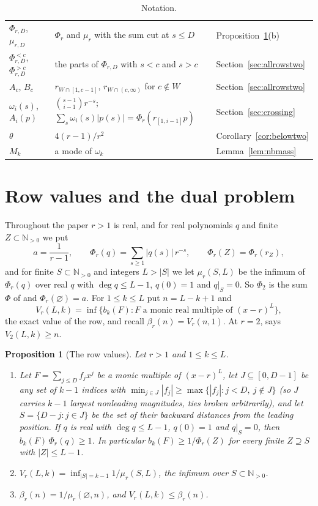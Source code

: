 \documentclass[11pt]{article}
\newtheorem{proposition}[theorem]{Proposition}
\newcommand{\N}{\mathbb N}
\begin{document}
\begin{table}[tp]
\begin{tabular}{@{}l p{} l@{}}
$\Phi_{r,D}$, $\mu_{r,D}$ & $\Phi_r$ and $\mu_r$ with the sum cut at $s\le D$
  & Proposition~\ref{prop:rowvalue}(b)\\
$\Phi_{r,D}^{<c}$, $\Phi_{r,D}^{>c}$ & the parts of $\Phi_{r,D}$ with
  $s<c$ and $s>c$ & Section~\ref{sec:allrowstwo}\\
$A_c$, $B_c$ & $r_{W\cap[1,c-1]}$, $r_{W\cap(c,\infty)}$ for $c\notin W$
  & Section~\ref{sec:allrowstwo}\\
$\omega_i(s)$, $A_i(p)$ & $\binom{s-1}{i-1}r^{-s}$;
  $\sum_s\omega_i(s)|p(s)|=\Phi_r(r_{[1,i-1]}p)$ & Section~\ref{sec:crossing}\\
$\theta$ & $4(r-1)/r^2$ & Corollary~\ref{cor:belowtwo}\\
$M_k$ & a mode of $\omega_k$ & Lemma~\ref{lem:nbmass}\\
\hline
\end{tabular}
\caption{Notation.}\label{tab:notation}
\end{table}

\section{Row values and the dual problem}\label{sec:rowvalues}

Throughout the paper $r>1$ is real, and for real polynomials $q$ and
finite $Z\subset\N_{>0}$ we put
\[
  a=\frac1{r-1},\qquad
  \Phi_r(q)=\sum_{s\ge1}|q(s)|\,r^{-s},\qquad
  \Phi_r(Z)=\Phi_r(r_Z),
\]
and for finite $S\subset\N_{>0}$ and integers $L>|S|$ we let
$\mu_r(S,L)$ be the infimum of $\Phi_r(q)$ over real $q$ with $\deg q\le L-1$,
$q(0)=1$ and $q|_S=0$.  So $\Phi_2$ is the sum $\Phi$ of
\cite[Section~5]{coefficient-mass} and $\Phi_r(\varnothing)=a$.  For
$1\le k\le L$ put $n=L-k+1$ and
\[
  V_r(L,k)=\inf\{b_k(F): F\text{ a monic real multiple of }(x-r)^L\},
\]
the exact value of the row, and recall $\beta_r(n)=V_r(n,1)$.  At
$r=2$, \cite[Theorem~5.9]{coefficient-mass} says $V_2(L,k)\ge n$.

\begin{proposition}[The row values]\label{prop:rowvalue}
Let $r>1$ and $1\le k\le L$.
\begin{enumerate}
\item[(a)] Let $F=\sum_{j\le D}f_jx^j$ be a monic multiple of $(x-r)^L$,
let $J\subseteq[0,D-1]$ be any set of $k-1$ indices with
$\min_{j\in J}|f_j|\ge\max\{|f_j|:j<D,\ j\notin J\}$ (so $J$ carries $k-1$
largest nonleading magnitudes, ties broken arbitrarily), and let
$S=\{D-j:j\in J\}$ be the set of their backward distances from the leading
position.  If $q$ is real with $\deg q\le L-1$, $q(0)=1$ and $q|_S=0$, then
$b_k(F)\,\Phi_r(q)\ge1$.  In particular $b_k(F)\ge1/\Phi_r(Z)$ for every
finite $Z\supseteq S$ with $|Z|\le L-1$.
\item[(b)] $V_r(L,k)=\inf_{|S|=k-1}1/\mu_r(S,L)$, the infimum over
$S\subset\N_{>0}$.
\item[(c)] $\beta_r(n)=1/\mu_r(\varnothing,n)$, and $V_r(L,k)\le\beta_r(n)$.
\end{enumerate}
\end{proposition}
\end{document}
